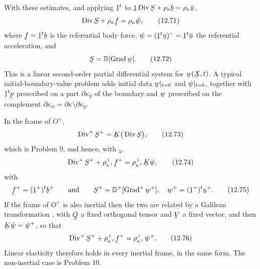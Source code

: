 With these estimates, and applying $\shift^{t}$ to
$\shift\Dvg\bS+\rho_{\kappa}\bb=\rho_{\kappa}\ddot\bu$,
\begin{equation}
   \Dvg\bS+\rho_{\kappa}\bff=\rho_{\kappa}\ddot\bw ,
   \tag{12.71}\label{eq:12.71}
\end{equation}
where $\bff=\shift^{t}\bb$ is the referential body force,
$\ddot\bw=(\shift^{t}\bu)^{\textstyle\cdot\cdot}=\shift^{t}\ddot\bu$ the
referential acceleration, and
\begin{equation}
   \bS=\mathbb{D}[\Grad\bw].
   \tag{12.72}\label{eq:12.72}
\end{equation}
This is a linear second-order partial differential system for
$\bw(\bX,t)$. A typical initial-boundary-value problem adds initial data
$\bw|_{t=0}$ and $\dot\bw|_{t=0}$, together with $\shift^{t}\bp$
prescribed on a part $\partial\kappa_{p}$ of the boundary and $\bw$
prescribed on the complement
$\partial\kappa_{w}=\partial\kappa\setminus\partial\kappa_{p}$.

In the frame of $O^{+}$,
\begin{equation}
   \Dvg^{+}\bS^{+}=\bK\big(\Dvg\bS\big),
   \tag{12.73}\label{eq:12.73}
\end{equation}
which is Problem 9, and hence, with $_{3}$,
\begin{equation}
   \Dvg^{+}\bS^{+}+\rho^{+}_{\kappa^{+}}\bff^{+}
   =\rho^{+}_{\kappa^{+}}\bK\ddot\bw ,
   \tag{12.74}\label{eq:12.74}
\end{equation}
with
\begin{equation}
   \bff^{+}=(\shift^{+})^{t}\bb^{+}
   \qquad\text{and}\qquad
   \bS^{+}=\mathbb{D}^{+}[\Grad^{+}\bw^{+}],\quad
   \bw^{+}=(\shift^{+})^{t}\bu^{+}.
   \tag{12.75}\label{eq:12.75}
\end{equation}
If the frame of $O^{+}$ is also inertial then the two are related by a
Galilean transformation , with $\bQ$ a fixed orthogonal tensor
and $\bV$ a fixed vector, and then $\bK\ddot\bw=\ddot\bw^{+}$, so that
\begin{equation}
   \Dvg^{+}\bS^{+}+\rho^{+}_{\kappa^{+}}\bff^{+}
   =\rho^{+}_{\kappa^{+}}\ddot\bw^{+}.
   \tag{12.76}\label{eq:12.76}
\end{equation}
Linear elasticity therefore holds in every inertial frame, in the same
form. The non-inertial case is Problem 10.

